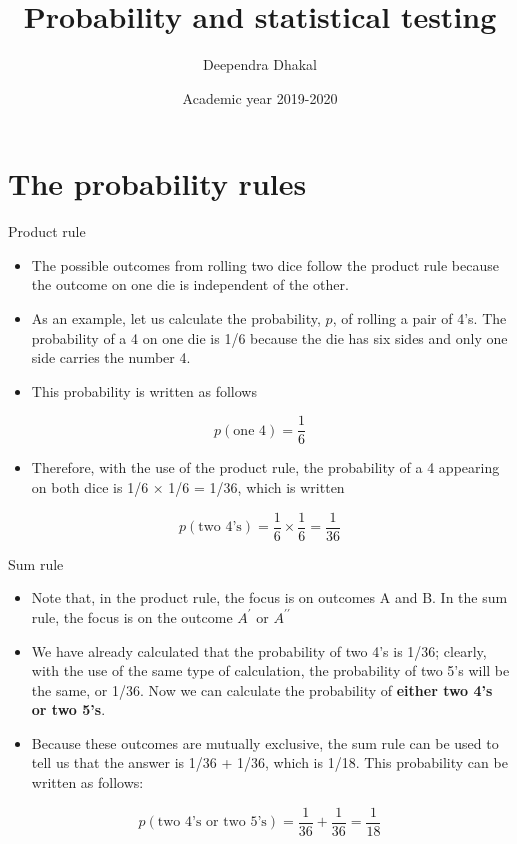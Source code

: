 \documentclass[11pt,ignorenonframetext,aspectratio=169]{beamer}
\title[]{Probability and statistical testing}
\author[
        Deependra Dhakal
    ]{Deependra Dhakal}
\institute[
    ]{
    Gokuleshwor Agriculture and Animal Science College\\
Tribhuwan University\\
\textit{ddhakal.rookie@gmail.com}\\
\url{https://rookie.rbind.io}
    }
\date[
      Academic year 2019-2020
  ]{
      Academic year 2019-2020
        }
\providecommand{\tightlist}{%
  \setlength{\itemsep}{0pt}\setlength{\parskip}{0pt}}
\begin{document}
  \begin{frame}[plain]
  \titlepage
  \end{frame}



\hypertarget{the-probability-rules}{%
\section{The probability rules}\label{the-probability-rules}}

\begin{frame}{Product rule}
\protect\hypertarget{product-rule}{}
\begin{itemize}
\tightlist
\item
  The possible outcomes from rolling two dice follow the product rule
  because the outcome on one die is independent of the other.
\item
  As an example, let us calculate the probability, \(p\), of rolling a
  pair of 4's. The probability of a 4 on one die is 1/6 because the die
  has six sides and only one side carries the number 4.
\item
  This probability is written as follows
\end{itemize}

\[
p (\textrm{one 4}) = \frac{1}{6}
\]

\begin{itemize}
\tightlist
\item
  Therefore, with the use of the product rule, the probability of a 4
  appearing on both dice is 1/6 × 1/6 = 1/36, which is written
\end{itemize}

\[
p (\textrm{two 4's}) = \frac{1}{6} \times \frac{1}{6} = \frac{1}{36}
\]
\end{frame}

\begin{frame}{Sum rule}
\protect\hypertarget{sum-rule}{}
\begin{itemize}
\tightlist
\item
  Note that, in the product rule, the focus is on outcomes A and B. In
  the sum rule, the focus is on the outcome \(A^\prime\) or
  \(A^{\prime \prime}\)
\item
  We have already calculated that the probability of two 4's is 1/36;
  clearly, with the use of the same type of calculation, the probability
  of two 5's will be the same, or 1/36. Now we can calculate the
  probability of \textbf{either two 4's or two 5's}.
\item
  Because these outcomes are mutually exclusive, the sum rule can be
  used to tell us that the answer is 1/36 + 1/36, which is 1/18. This
  probability can be written as follows:
\end{itemize}

\[
p(\textrm{two 4's or two 5's}) = \frac{1}{36} + \frac{1}{36} = \frac{1}{18}
\]
\end{frame}
\end{document}
